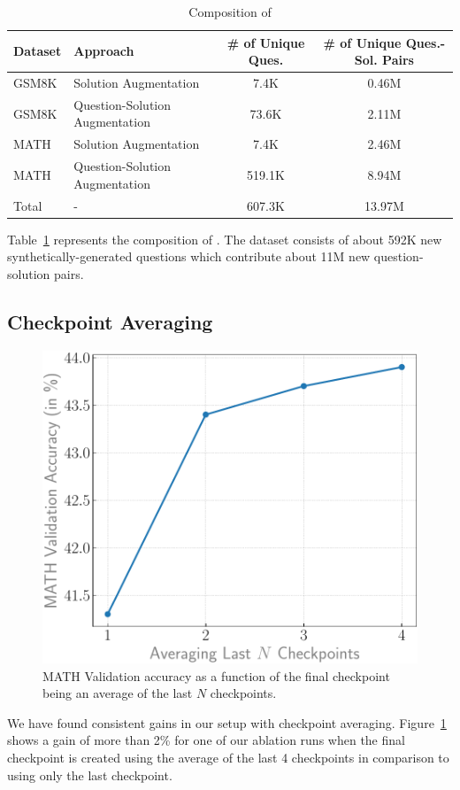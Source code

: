\begin{table}[t]
    \centering
    \caption{Composition of \dataset}
    \label{tab:dataset_composition}
    \begin{tabular}{llcc}
    \toprule
       Dataset  &  Approach & \# of Unique Ques. &  \# of Unique Ques.-Sol. Pairs\\ 
       \midrule 
       
       GSM8K  & Solution Augmentation & \phantom{00}7.4K & \phantom{0}0.46M \\
       GSM8K & Question-Solution Augmentation & \phantom{0}73.6K & \phantom{0}2.11M \\
       MATH & Solution Augmentation & \phantom{00}7.4K & \phantom{0}2.46M\\
       MATH & Question-Solution Augmentation & 519.1K & \phantom{0}8.94M \\ \midrule
       Total &   -   &  607.3K & 13.97M \\
       \bottomrule
       
    \end{tabular}
\end{table}

Table~\ref{tab:dataset_composition} represents the composition of \dataset. The dataset consists of about 592K new synthetically-generated questions which contribute about 11M new question-solution pairs.  


\subsection{Checkpoint Averaging}
\label{sec:app_ckpt_avging}
\begin{figure}[t]
    \centering
    \includegraphics[width=0.85\linewidth]{plots/ckpt_avging.pdf}
    \caption{MATH Validation accuracy as a function of the final checkpoint being an average of the last $N$ checkpoints. }
    \label{fig:ckpt_avging}
\end{figure}

We have found consistent gains in our setup with checkpoint averaging.  
Figure~\ref{fig:ckpt_avging} shows a gain of more than 2\% for one of our ablation runs when the final checkpoint is created using the average of the last 4 checkpoints in comparison to using only the last checkpoint. 







